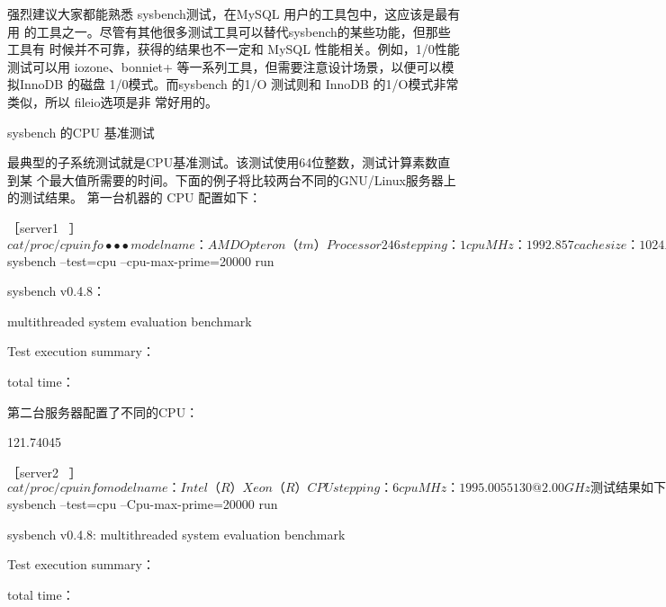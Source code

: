 强烈建议大家都能熟悉 sysbench测试，在MySQL 用户的工具包中，这应该是最有用
的工具之一。尽管有其他很多测试工具可以替代sysbench的某些功能，但那些工具有
时候并不可靠，获得的结果也不一定和 MySQL 性能相关。例如，1/0性能测试可以用
iozone、bonniet+ 等一系列工具，但需要注意设计场景，以便可以模拟InnoDB 的磁盘
1/0模式。而sysbench 的1/O 测试则和 InnoDB 的1/O模式非常类似，所以 fileio选项是非
常好用的。

sysbench 的CPU 基准测试

最典型的子系统测试就是CPU基准测试。该测试使用64位整数，测试计算素数直到某
个最大值所需要的时间。下面的例子将比较两台不同的GNU/Linux服务器上的测试结果。
第一台机器的 CPU 配置如下：

［server1 ~］$ cat /proc/cpuinfo

•••

model name

：AMD Opteron（tm）Processor 246

stepping

：1

cpu MHz

：1992.857

cache size

：1024 KB

在这台服务器上运行如下的测试：

［server1 ~］$ sysbench --test=cpu --cpu-max-prime=20000 run

sysbench v0.4.8：

multithreaded system evaluation benchmark

Test execution summary：

total time：

第二台服务器配置了不同的CPU：

121.74045

［server2 ~］$ cat /proc/cpuinfo

model name

： Intel（R） Xeon（R） CPU

stepping

：6

cpu MHz

：1995.005

5130 @ 2.00GHz

测试结果如下：

［server1 ~］$ sysbench --test=cpu --Cpu-max-prime=20000 run

sysbench v0.4.8: multithreaded system evaluation benchmark

Test execution summary：

total time：


